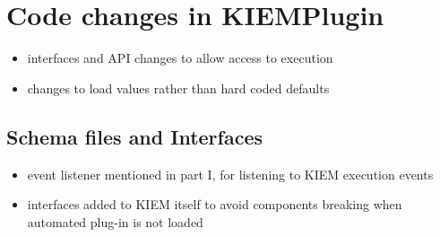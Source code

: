 \chapter{Code changes in KIEMPlugin}
\label{chapter:AutoKiemChanges}
\begin{itemize}
 \item interfaces and API changes to allow access to execution
 \item changes to load values rather than hard coded defaults
\end{itemize}

\section{Schema files and Interfaces}
\begin{itemize}
 \item event listener mentioned in part I, for listening to KIEM execution
 events
 \item interfaces added to KIEM itself to avoid components breaking when
 automated plug-in is not loaded
\end{itemize}
